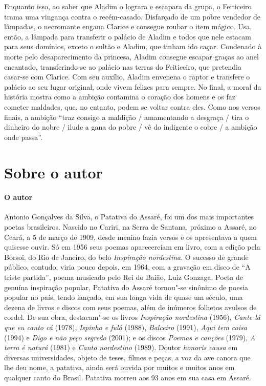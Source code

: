 \documentclass[11pt]{extarticle}
\begin{document}
Enquanto isso, ao saber que Aladim o lograra e escapara da grupa, o Feiticeiro trama uma vingança contra o recém-casado. Disfarçado de um pobre vendedor de lâmpadas, o necromante engana Clarice e consegue roubar o item mágico. Usa, então, a lâmpada para transferir o palácio de Aladim e todos que nele estacam para seus domínios, exceto o sultão e Aladim, que tinham ido caçar. Condenado à morte pelo desaparecimento da princesa, Aladim consegue escapar graças ao anel encantado, transferindo-se ao palácio nas terras do Feiticeiro, que pretendia casar-se com Clarice. Com seu auxílio, Aladim envenena o raptor e transfere o palácio ao seu lugar original, onde vivem felizes para sempre. No final, a moral da história mostra como a ambição contamina o coração dos homens e os faz cometer maldades, que, no entanto, podem se voltar contra eles. Como nos versos finais, a ambição ``traz consigo a maldição / amamentando a desgraça / tira o dinheiro do nobre / ilude a gana do pobre / vê do indigente o cobre / a ambição onde passa''.




\section{Sobre o autor}


\paragraph{O autor}
Antonio Gonçalves da Silva, o Patativa do Assaré, foi um dos mais importantes
poetas brasileiros. Nascido no Cariri, na Serra de Santana, próximo a Assaré,
no Ceará, a 5 de março de 1909, desde menino fazia versos e os apresentava a
quem quisesse ouvir. Só em 1956 seus poemas aparecereiam em livro, com a edição
pela Borsoi, do Rio de Janeiro, do belo \textit{Inspiração nordestina}. O
sucesso de grande público, contudo, viria pouco depois, em 1964, com a gravação
em disco de ``A triste partida'', poema musicado pelo Rei do Baião, Luiz
Gonzaga. Poeta de genuína inspiração popular, Patativa do Assaré tornou"-se
sinônimo de poesia popular no país, tendo lançado, em sua longa vida de quase
um século, uma dezena de livros e discos com seus poemas, além de inúmeros
folhetos avulsos de cordel. De sua obra, destacam"-se os livros
\textit{Inspiração nordestina} (1956), \textit{Cante lá que eu canto cá}
(1978), \textit{Ispinho e fulô} (1988), \textit{Balceiro} (1991), \textit{Aqui
tem coisa} (1994) e \textit{Digo e não peço segredo} (2001); e os discos
\textit{Poemas e canções} (1979), \textit{A terra é naturá} (1981) e
\textit{Canto nordestino} (1989). Doutor \textit{honoris causa} em diversas
universidades, objeto de teses, filmes e peças, a voz da ave canora que lhe deu
nome, a patativa, ainda será ouvida por muitos e muitos anos em qualquer canto
do Brasil. Patativa morreu aos 93 anos em sua casa em Assaré.
\end{document}
